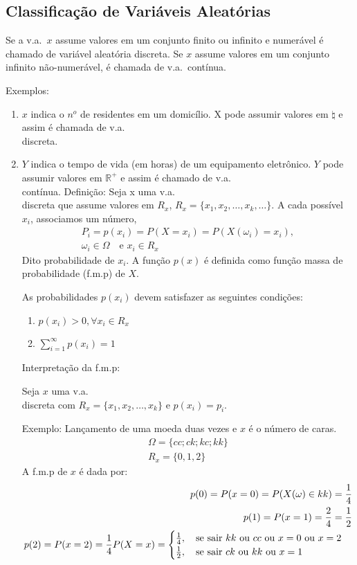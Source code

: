 \documentclass[11pt,a4paper]{article}
\begin{document}
\subsection{Classificação de Variáveis Aleatórias}
Se a v.a.\ $x$ assume valores em um conjunto finito ou infinito e numerável é chamado 
de variável aleatória discreta. Se $x$ assume valores em um conjunto infinito não-numerável,
é chamada de v.a.\ contínua.

Exemplos:

\begin{enumerate}[label=(\alph*)]
  \item $x$ indica o $n^o$ de residentes em um domicílio. X pode assumir valores em $\natural$ e assim é chamada de 
    v.a.\\ discreta.

  \item $Y$ indica o tempo de vida (em horas) de um equipamento eletrônico. $Y$ pode 
    assumir valores em $\mathbb{R}^+$ e assim é chamado de v.a.\\ contínua.
    Definição: Seja x uma v.a.\\ discreta que assume valores em $R_{x}$, $R_{x}=\{x_1,x_2,\dots,
    x_{k},\dots\}$. A cada possível $x_{i}$, associamos um número, 
    \begin{align*}
      P_{i}=p({x_i})=P(X={x_i})=P(X( \omega_i)=x_i),\\
      \omega_{i} \in \Omega \quad \text{e } x_{i} \in R_{x} \nonumber
    \end{align*}
    Dito probabilidade de $x_{i}$. A função $p(x)$ é definida como função massa de probabilidade 
    (f.m.p) de $X$. 

    As probabilidades $p(x_i)$ devem satisfazer as seguintes condições: 
    \begin{enumerate} %
      \item $p(x_i)>0, \forall x_i \in R_{x}$

      \item $\sum^\infty_{i=1} p(x_i)=1$
    \end{enumerate}
    Interpretação da f.m.p: 

    Seja $x$ uma v.a.\\ discreta com $R_{x}= \{x_1,x_2,\dots,x_k \}$ e $p(x_i)=p_i$.

    Exemplo: Lançamento de uma moeda duas vezes e $x$ é o número de caras.
    \begin{align}
      \Omega = \{ cc;ck;kc;kk \} \\
      R_{x}= \{0,1,2\}
    \end{align}
    A f.m.p de $x$ é dada por: 
    \begin{align}
      p(0)=P(x=0)=P(X(\omega)\in kk)=\frac{1}{4} \\
      p(1)=P(x=1)=\frac{2}{4}=\frac{1}{2}\\
      p(2)=P(x=2)=\frac{1}{4}
      P(X=x)= \begin{cases}
        \frac{1}{4}, \text{\quad se sair $kk$ ou $cc$ ou $x=0$ ou $x=2$}\\
        \frac{1}{2}, \text{\quad se sair $ck$ ou $kk$ ou $x=1$ }
      \end{cases}
    \end{align}
\end{enumerate}
\end{document}
